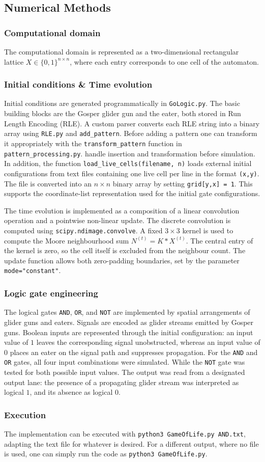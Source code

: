\subsection{Numerical Methods}

\subsubsection{Computational domain}
The computational domain is represented as a two-dimensional rectangular lattice $X \in \{0,1\}^{n\times n}$, where
each entry corresponds to one cell of the automaton.

\subsubsection{Initial conditions \& Time evolution}
Initial conditions are generated programmatically in \texttt{GoLogic.py}. The basic building blocks are the Gosper
glider gun and the eater, both stored in Run Length Encoding (RLE). A custom parser converts each RLE string into a
binary array using \texttt{RLE.py} and \texttt{add\_pattern}. Before adding a pattern one can transform it
appropriately with the \texttt{transform\_pattern} function in \texttt{pattern\_processing.py}.
handle insertion and transformation before simulation. In addition, the function \texttt{load\_live\_cells(filename, n)}
loads external initial configurations from text files containing one live cell per line in the format \texttt{(x,y)}.
The file is converted into an $n\times n$ binary array by setting \texttt{grid[y,x] = 1}.
This supports the coordinate-list representation used for the initial gate configurations.

The time evolution is implemented as a composition of a linear convolution operation and a pointwise
non-linear update. The discrete convolution is computed using \texttt{scipy.ndimage.convolve}. A fixed
$3\times 3$ kernel is used to compute the Moore neighbourhood sum $N^{(t)} = K * X^{(t)}$.
The central entry of the kernel is zero, so the cell itself is excluded from the neighbour count. The update
function allows both zero-padding boundaries, set by the parameter \texttt{mode="constant"}.

\subsubsection{Logic gate engineering}
The logical gates \texttt{AND}, \texttt{OR}, and \texttt{NOT} are implemented by spatial arrangements of glider guns and eaters.
Signals are encoded as glider streams emitted by Gosper guns. Boolean inputs are represented through the initial configuration: an input value of $1$ leaves the
corresponding signal unobstructed, whereas an input value of $0$ places an eater on the signal path and suppresses propagation. For the \texttt{AND} and \texttt{OR} gates, all four input combinations were simulated. While the \texttt{NOT} gate was tested for both possible input values.
The output was read from a designated output lane: the presence of a propagating glider stream was interpreted as logical $1$, and its absence as logical $0$.

\subsubsection{Execution}
The implementation can be executed with \texttt{python3 GameOfLife.py AND.txt}, adapting the text file for
whatever is desired. For a different output, where no file is used, one can simply run the code as \texttt{python3 GameOfLife.py}.
